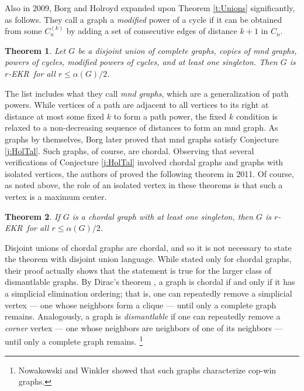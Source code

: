 \documentclass{article}
\newtheorem{thm}{Theorem}%
\def\a{{\alpha}}
\def\ekr{{\sf EKR}}
\begin{document}
Also in 2009, Borg and Holroyd \cite{BorgHolrSingle} expanded upon Theorem \ref{t:Unions} significantly, as follows.
They call a graph a {\it modified} power of a cycle if it can be obtained from some $C_n^{(k)}$ by adding a set of consecutive edges of distance $k+1$ in $C_n$.

\begin{thm}
\label{t:MoreUnions}
Let $G$ be a disjoint union of complete graphs, copies of mnd graphs, powers of cycles, modified powers of cycles, and at least one singleton.
Then $G$ is $r$-\ekr\ for all $r\le \a(G)/2$.
\end{thm}

The list includes what they call {\it mnd graphs}, which are a generalization of path powers.
While vertices of a path are adjacent to all vertices to its right at distance at most some fixed $k$ to form a path power, the fixed $k$ condition is relaxed to a non-decreasing sequence of distances to form an mnd graph.
As graphs by themselves, Borg \cite{BorgEKRSep} later proved that mnd graphs satisfy Conjecture \ref{j:HolTal}.
Such graphs, of course, are chordal.
Observing that several verifications of Conjecture \ref{j:HolTal} involved chordal graphs and graphs with isolated vertices, the authors of \cite{HurlKamaChord} proved the following theorem in 2011.
Of course, as noted above, the role of an isolated vertex in these theorems is that such a vertex is a maximum center.

\begin{thm}
\label{t:Chordal}
If $G$ is a chordal graph with at least one singleton, then $G$ is $r$-\ekr\ for all $r\le \a(G)/2$.
\end{thm}

Disjoint unions of chordal graphs are chordal, and so it is not necessary to state the theorem with disjoint union language.
While stated only for chordal graphs, their proof actually shows that the statement is true for the larger class of dismantlable graphs.
By Dirac's theorem \cite{Dirac}, a graph is chordal if and only if it has a simplicial elimination ordering; that is, one can repeatedly remove a simplicial vertex --- one whose neighbors form a clique --- until only a complete graph remains.
Analogously, a graph is {\it dismantlable} if one can repeatedly remove a {\it corner} vertex --- one whose neighbors are neighbors of one of its neighbors --- until only a complete graph remains.%
\footnote{Nowakowski and Winkler \cite{NowaWink} showed that such graphs characterize cop-win graphs.}
\end{document}
